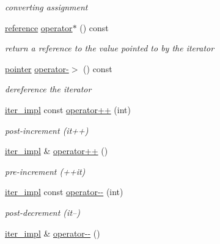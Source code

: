 \begin{DoxyCompactItemize}
\begin{DoxyCompactList}\small\item\em converting assignment \end{DoxyCompactList}\item 
\hyperlink{classnlohmann_1_1detail_1_1iter__impl_a5be8001be099c6b82310f4d387b953ce}{reference} \hyperlink{classnlohmann_1_1detail_1_1iter__impl_a5ca57856d9bba54a5fc51cee891de827}{operator$\ast$} () const
\begin{DoxyCompactList}\small\item\em return a reference to the value pointed to by the iterator \end{DoxyCompactList}\item 
\hyperlink{classnlohmann_1_1detail_1_1iter__impl_a69e52f890ce8c556fd68ce109e24b360}{pointer} \hyperlink{classnlohmann_1_1detail_1_1iter__impl_a6da3d2b34528aff328f3dcb513076dec}{operator-\/$>$} () const
\begin{DoxyCompactList}\small\item\em dereference the iterator \end{DoxyCompactList}\item 
\hyperlink{classnlohmann_1_1detail_1_1iter__impl}{iter\+\_\+impl} const \hyperlink{classnlohmann_1_1detail_1_1iter__impl_a7d2397773b2dce42f30f0375a6a1d850}{operator++} (int)
\begin{DoxyCompactList}\small\item\em post-\/increment (it++) \end{DoxyCompactList}\item 
\hyperlink{classnlohmann_1_1detail_1_1iter__impl}{iter\+\_\+impl} \& \hyperlink{classnlohmann_1_1detail_1_1iter__impl_abdfe2a7f464400a7ab572782d14b922f}{operator++} ()
\begin{DoxyCompactList}\small\item\em pre-\/increment (++it) \end{DoxyCompactList}\item 
\hyperlink{classnlohmann_1_1detail_1_1iter__impl}{iter\+\_\+impl} const \hyperlink{classnlohmann_1_1detail_1_1iter__impl_a1fc43e764467b8ea4a4cdd01f629d757}{operator-\/-\/} (int)
\begin{DoxyCompactList}\small\item\em post-\/decrement (it--) \end{DoxyCompactList}\item 
\hyperlink{classnlohmann_1_1detail_1_1iter__impl}{iter\+\_\+impl} \& \hyperlink{classnlohmann_1_1detail_1_1iter__impl_a84e689fb581d651d130039f7cb81494a}{operator-\/-\/} ()

\end{DoxyCompactItemize}
